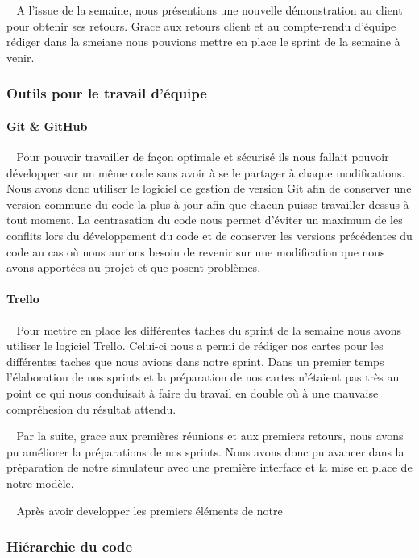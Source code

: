 \documentclass[12pt]{article}
\def\tab{$\>\>\>\>$}
\begin{document}
\tab A l'issue de la semaine, nous présentions une nouvelle démonstration au client pour obtenir ses retours. Grace aux retours client et au compte-rendu d'équipe rédiger dans la smeiane nous pouvions mettre en place le sprint de la semaine à venir.

\newpage

\subsubsection{Outils pour le travail d'équipe}
\paragraph{Git \& GitHub\\}
\tab Pour pouvoir travailler de façon optimale et sécurisé ils nous fallait pouvoir développer sur un même code sans avoir à se le partager à chaque modifications. Nous avons donc utiliser le logiciel de gestion de version Git afin de conserver une version commune du code la plus à jour afin que chacun puisse travailler dessus à tout moment. La centrasation du code nous permet d'éviter un maximum de les conflits lors du développement du code et de conserver les versions précédentes du code au cas où nous aurions besoin de revenir sur une modification que nous avons apportées au projet et que posent problèmes.

\paragraph{Trello\\}
\tab Pour mettre en place les différentes taches du sprint de la semaine nous avons utiliser le logiciel Trello. Celui-ci nous a permi de rédiger nos cartes pour les différentes taches que nous avions dans notre sprint. Dans un premier temps l'élaboration de nos sprints et la préparation de nos cartes n'étaient pas très au point ce qui nous conduisait à faire du travail en double où à une mauvaise compréhesion du résultat attendu.

\tab Par la suite, grace aux premières réunions et aux premiers retours, nous avons pu améliorer la préparations de nos sprints. Nous avons donc pu avancer dans la préparation de notre simulateur avec une première interface et la mise en place de notre modèle.

\tab Après avoir developper les premiers éléments de notre

\subsubsection{Hiérarchie du code}
\end{document}

